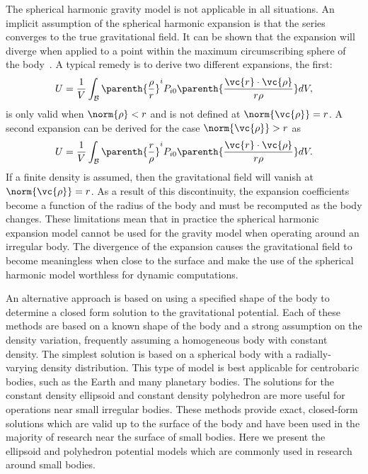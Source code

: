 The spherical harmonic gravity model is not applicable in all situations.
An implicit assumption of the spherical harmonic expansion is that the series converges to the true gravitational field.
It can be shown that the expansion will diverge when applied to a point within the maximum circumscribing sphere of the body~\cite{scheeres2012a}.
A typical remedy is to derive two different expansions, the first:
\begin{align}
    U = \frac{1}{V} \int_{\mathcal{B}} \parenth{ \frac{\rho}{r}}^i P_{i0} \parenth{ \frac{\vc{r} \cdot \vc{\rho}}{ r \rho}} dV, 
\end{align}
is only valid when \( \norm{\rho} < r \) and is not defined at \( \norm{\vc{\rho}} = r\).
A second expansion can be derived for the case \(\norm{\vc{\rho}} > r \) as
\begin{align}
    U = \frac{1}{V} \int_{\mathcal{B}} \parenth{ \frac{r}{\rho}}^i P_{i0} \parenth{ \frac{\vc{r} \cdot \vc{\rho}}{ r \rho}} dV. 
\end{align}
If a finite density is assumed, then the gravitational field will vanish at \( \norm{\vc{\rho}} = r \).
As a result of this discontinuity, the expansion coefficients become a function of the radius of the body and must be recomputed as the body changes.
These limitations mean that in practice the spherical harmonic expansion model cannot be used for the gravity model when operating around an irregular body.
The divergence of the expansion causes the gravitational field to become meaningless when close to the surface and make the use of the spherical harmonic model worthless for dynamic computations.

An alternative approach is based on using a specified shape of the body to determine a closed form solution to the gravitational potential.
Each of these methods are based on a known shape of the body and a strong assumption on the density variation, frequently assuming a homogeneous body with constant density.
The simplest solution is based on a spherical body with a radially-varying density distribution.
This type of model is best applicable for centrobaric bodies, such as the Earth and many planetary bodies.
The solutions for the constant density ellipsoid and constant density polyhedron are more useful for operations near small irregular bodies.
These methods provide exact, closed-form solutions which are valid up to the surface of the body and have been used in the majority of research near the surface of small bodies.
Here we present the ellipsoid and polyhedron potential models which are commonly used in research around small bodies.

